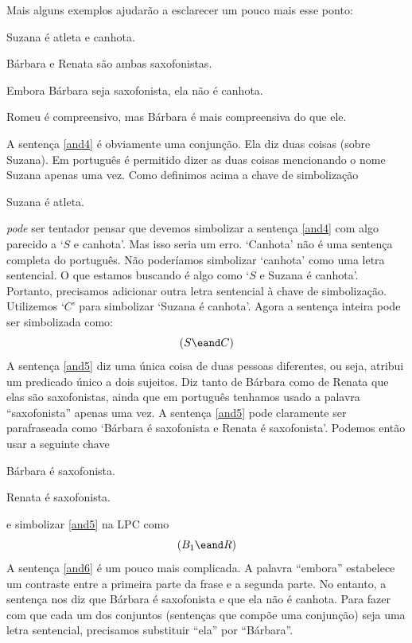 Mais alguns exemplos ajudarão a esclarecer um pouco mais esse ponto:
	\begin{earg}
		\item[\ex{and4}]Suzana é atleta e canhota.
		\item[\ex{and5}]Bárbara e Renata são ambas saxofonistas.
		\item[\ex{and6}]Embora Bárbara seja saxofonista, ela não é canhota.
		\item[\ex{and7}]Romeu é compreensivo, mas Bárbara é mais compreensiva do que ele.
	\end{earg}
A sentença \ref{and4} é obviamente uma conjunção.
Ela diz duas coisas (sobre Suzana).
Em português é permitido dizer as duas coisas mencionando o nome Suzana apenas uma vez.
Como definimos acima a chave de simbolização 
	\begin{ekey}
		\item[S] Suzana é atleta.
	\end{ekey}
\emph{pode} ser tentador pensar que devemos simbolizar a sentença \ref{and4} com algo parecido a `$S$ e canhota'.
Mas isso seria um erro.
`Canhota' não é uma sentença completa do português.
Não poderíamos simbolizar `canhota' como uma letra sentencial.
O que estamos buscando é algo como `$S$ e Suzana é canhota'.
Portanto, precisamos adicionar outra letra sentencial à chave de simbolização. Utilizemos `$C$' para simbolizar `Suzana é canhota'.
Agora a sentença inteira pode ser simbolizada como:
$$(S \eand C)$$	
A sentença \ref{and5} diz uma única coisa de duas pessoas diferentes, ou seja, atribui um predicado único a dois sujeitos.
Diz tanto de Bárbara como de Renata que elas são saxofonistas, ainda que em português tenhamos usado a palavra ``saxofonista'' apenas uma vez.
A sentença \ref{and5} pode claramente ser parafraseada como `Bárbara é saxofonista e Renata é saxofonista'.
Podemos então usar a seguinte chave
	\begin{ekey}
		\item[B_1] Bárbara é saxofonista.
		\item[R] Renata é saxofonista.
	\end{ekey}
e simbolizar \ref{and5} na LPC como
$$(B_1 \eand R)$$
A sentença \ref {and6} é um pouco mais complicada.
A palavra ``embora'' estabelece um contraste entre a primeira parte da frase e a segunda parte.
No entanto, a sentença nos diz que Bárbara é saxofonista e que ela não é canhota.
Para fazer com que cada um dos conjuntos (sentenças que compõe uma conjunção) seja uma letra sentencial, precisamos substituir ``ela'' por ``Bárbara''.
